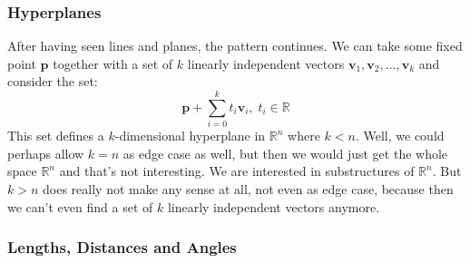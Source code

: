 \subsubsection{Hyperplanes}
After having seen lines and planes, the pattern continues. We can take some fixed point $\mathbf{p}$ together with a set of $k$ linearly independent vectors $\mathbf{v}_1, \mathbf{v}_2, \ldots, \mathbf{v}_k$ and consider the set:
\begin{equation}
 \mathbf{p} + \sum_{i=0}^{k} t_i \mathbf{v}_i, \; t_i \in \mathbb{R}
\end{equation}
This set defines a $k$-dimensional hyperplane in $\mathbb{R}^n$ where $k < n$. Well, we could perhaps allow $k=n$ as edge case as well, but then we would just get the whole space $\mathbb{R}^n$ and that's not interesting. We are interested in substructures of $\mathbb{R}^n$. But $k > n$ does really not make any sense at all, not even as edge case, because then we can't even find a set of $k$ linearly independent vectors anymore.







\subsubsection{Lengths, Distances and Angles}


